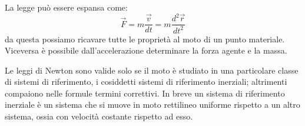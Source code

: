 \documentclass[class=book, crop=false, oneside, 12pt]{standalone}
\begin{document}
La legge può essere espansa come:
\begin{equation}
    \overrightarrow{F} = m \frac{\overrightarrow{v}}{dt} = m \frac{d^2 \overrightarrow{r}}{dt^2}
\end{equation}
da questa possiamo ricavare tutte le proprietà al moto di un punto materiale. Viceversa è possibile dall'accelerazione determinare la forza agente e la massa.

Le leggi di Newton sono valide solo se il moto è studiato in una particolare classe di sistemi di riferimento, i cosiddetti sistemi di riferimento inerziali; altrimenti compaiono nelle formule termini correttivi.
In breve un sistema di riferimento inerziale è un sistema che si muove in moto rettilineo uniforme rispetto a un altro sistema, ossia con velocità costante rispetto ad esso.
\end{document}
